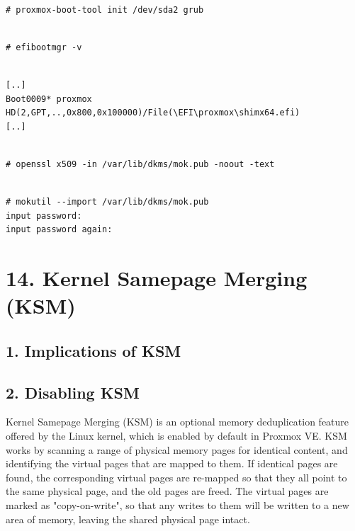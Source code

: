 \begin{lstlisting}

# proxmox-boot-tool init /dev/sda2 grub

\end{lstlisting}

\begin{lstlisting}

# efibootmgr -v

\end{lstlisting}

\begin{lstlisting}

[..]
Boot0009* proxmox       HD(2,GPT,..,0x800,0x100000)/File(\EFI\proxmox\shimx64.efi)
[..]

\end{lstlisting}

\begin{lstlisting}

# openssl x509 -in /var/lib/dkms/mok.pub -noout -text

\end{lstlisting}

\begin{lstlisting}

# mokutil --import /var/lib/dkms/mok.pub
input password:
input password again:

\end{lstlisting}


\section{14. Kernel Samepage Merging (KSM)}

\subsection{1. Implications of KSM}

\subsection{2. Disabling KSM}

Kernel Samepage Merging (KSM) is an optional memory deduplication feature offered by the Linux kernel, which is enabled by default in Proxmox VE. KSM works by scanning a range of physical memory pages for identical content, and identifying the virtual pages that are mapped to them. If identical pages are found, the corresponding virtual pages are re-mapped so that they all point to the same physical page, and the old pages are freed. The virtual pages are marked as "copy-on-write", so that any writes to them will be written to a new area of memory, leaving the shared physical page intact.

